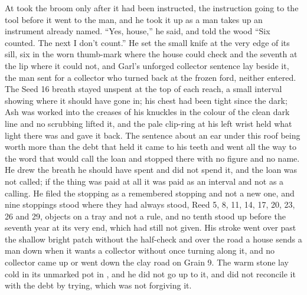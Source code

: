 At   took the broom only after it had been instructed, the instruction going to the tool before it went to the man, and he took it up as a man takes up an instrument already named. “Yes, house,” he said, and told the wood “Six counted. The next I don't count.” He set the small knife at the very edge of its sill, six in the worn thumb-mark where the house could check and the seventh at the lip where it could not, and Garl's unforged collector sentence lay beside it, the man sent for a collector who turned back at the frozen ford, neither entered. The Seed 16 breath stayed unspent at the top of each reach, a small interval showing where it should have gone in; his chest had been tight since the dark; Ash was worked into the creases of his knuckles in the colour of the clean dark line and no scrubbing lifted it, and the pale clip-ring at his left wrist held what light there was and gave it back. The sentence about an ear under this roof being worth more than the debt that held it came to his teeth and went all the way to the word that would call the loan and stopped there with no figure and no name. He drew the breath he should have spent and did not spend it, and the loan was not called; if the thing was paid at all it was paid as an interval and not as a calling. He filed the stopping as a remembered stopping and not a new one, and nine stoppings stood where they had always stood, Reed 5, 8, 11, 14, 17, 20, 23, 26 and 29, objects on a tray and not a rule, and no tenth stood up before the seventh year at its very end, which had still not given. His stroke went over  past the shallow bright patch without the half-check and over the road a house sends a man down when it wants a collector without once turning along it, and no collector came up or went down the clay road on Grain 9. The warm stone lay cold in its unmarked pot in , and he did not go up to it, and did not reconcile it with the debt by trying, which was not forgiving it.

